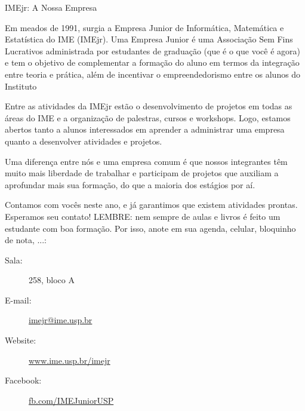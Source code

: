 \begin{subsecao}{IMEjr: A Nossa Empresa}


Em meados de 1991, surgia a Empresa Junior de Informática, Matemática e
Estatística do IME (IMEjr). Uma Empresa Junior é uma Associação Sem Fins
Lucrativos administrada por estudantes de graduação (que é o que você é agora)
e tem o objetivo de complementar a formação do aluno em termos da integração
entre teoria e prática, além de incentivar o empreendedorismo entre os alunos
do Instituto

Entre as atividades da IMEjr estão o desenvolvimento de projetos em todas as
áreas do IME e a organização de palestras, cursos e workshops. Logo, estamos
abertos tanto a alunos interessados em aprender a administrar uma empresa
quanto a desenvolver atividades e projetos.

Uma diferença entre nós e uma empresa comum é que nossos integrantes têm muito
mais liberdade de trabalhar e participam de projetos que auxiliam a aprofundar
mais sua formação, do que a maioria dos estágios por aí.

Contamos com vocês neste ano, e já garantimos que existem atividades prontas.
Esperamos seu contato! LEMBRE: nem sempre de aulas e livros é feito um
estudante com boa formação. Por isso, anote em sua agenda, celular, bloquinho
de nota, ...:

\begin{description}
\item [Sala:] 258, bloco A
\item[E-mail:] \url{imejr@ime.usp.br}
\item[Website:] \url{www.ime.usp.br/imejr}
\item[Facebook:] \url{fb.com/IMEJuniorUSP}
\end{description}

\end{subsecao}

